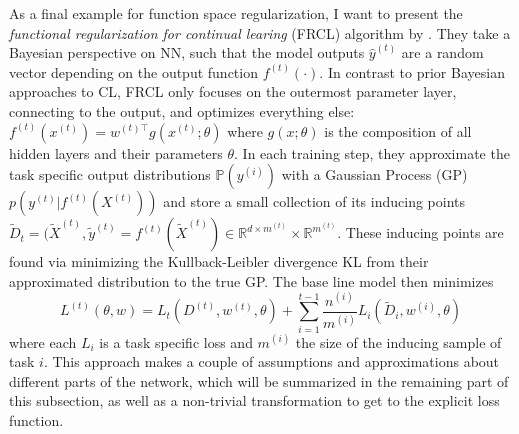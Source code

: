 \setlength{\parindent}{20pt}
As a final example for function space regularization, I want to present the \textit{functional regularization for continual learing} (FRCL) algorithm by \citeauthor{titsias2020functionalregularisationcontinuallearning} \cite{titsias2020functionalregularisationcontinuallearning}. They take a Bayesian perspective on NN, such that the model outputs $\hat{y}^{(t)}$ are a random vector depending on the output function $f^{(t)}(\cdot)$. In contrast to prior Bayesian approaches to CL, FRCL only focuses on the outermost parameter layer, connecting to the output, and optimizes everything else: $f^{(t)}(x^{(t)}) = w^{(t)\top} g(x^{(t)}; \theta)$ where $g(x;\theta)$ is the composition of all hidden layers and their parameters $\theta$. In each training step, they approximate the task specific output distributions $\mathbb{P}(y^{(i)})$ with a Gaussian Process (GP) \cite{Ludkovski2025} $p(y^{(t)}|f^{(t)}(X^{(t)}))$ and store a small collection of its inducing points $\tilde{D}_t=(\tilde{X}^{(t)}, \tilde{y}^{(t)} = f^{(t)}(\tilde{X}^{(t)})\in \mathbb{R}^{d\times m^{(t)}}\times \mathbb{R}^{m^{(t)}} $. These inducing points are found via minimizing the Kullback-Leibler divergence KL from their approximated distribution to the true GP. The base line model then minimizes 
\begin{equation}\label{bFrcl}
	L^{(t)}(\theta, w) = L_t(D^{(t)}, w^{(t)}, \theta) + \sum_{i=1}^{t-1}\frac{n^{(i)}}{m^{(i)}}  L_i(\tilde{D}_i,w^{(i)}, \theta)
\end{equation}
where each $L_i$ is a task specific loss and $m^{(i)}$ the size of the inducing sample of task $i$.
This approach makes a couple of assumptions and approximations about different parts of the network, which will be summarized in the remaining part of this subsection, as well as a non-trivial transformation to get to the explicit loss function.

